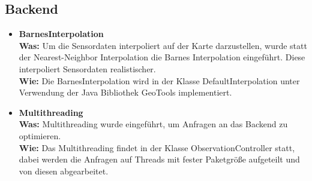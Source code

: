 \subsection{Backend}
\begin{itemize}
	\item \textbf{BarnesInterpolation}
	\\
	\textbf{Was:} Um die Sensordaten interpoliert auf der Karte darzustellen, wurde statt der Nearest-Neighbor Interpolation die Barnes Interpolation eingeführt. Diese interpoliert Sensordaten realistischer.
	\\
	\textbf{Wie:} Die BarnesInterpolation wird in der Klasse DefaultInterpolation unter Verwendung der Java Bibliothek GeoTools implementiert. 
	\item \textbf{Multithreading}
	\\
	\textbf{Was:} Multithreading wurde eingeführt, um Anfragen an das Backend zu optimieren.
	\\
	\textbf{Wie:} Das Multithreading findet in der Klasse ObservationController statt, dabei werden die Anfragen auf Threads mit fester Paketgröße aufgeteilt und von diesen abgearbeitet.
\end{itemize}
